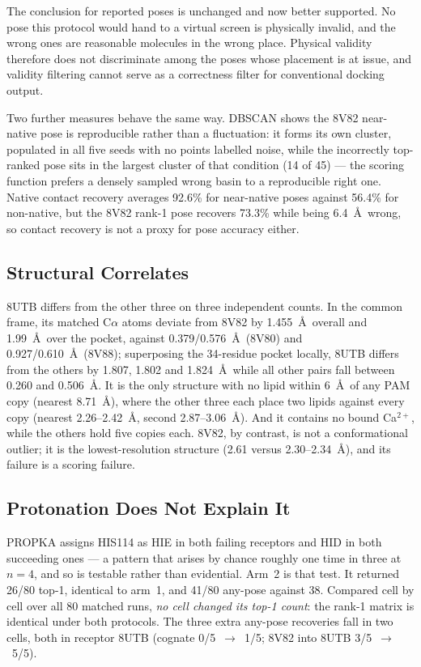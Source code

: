 \documentclass[sigconf]{acmart}
\begin{document}
The conclusion for reported poses is unchanged and now better supported. No pose
this protocol would hand to a virtual screen is physically invalid, and the wrong
ones are reasonable molecules in the wrong place. Physical validity therefore does
not discriminate among the poses whose placement is at issue, and validity
filtering cannot serve as a correctness filter for conventional docking output.

Two further measures behave the same way. DBSCAN shows the 8V82 near-native pose
is reproducible rather than a fluctuation: it forms its own cluster, populated in
all five seeds with no points labelled noise, while the incorrectly top-ranked
pose sits in the largest cluster of that condition (14 of 45) --- the scoring
function prefers a densely sampled wrong basin to a reproducible right one. Native
contact recovery averages 92.6\% for near-native poses against 56.4\% for
non-native, but the 8V82 rank-1 pose recovers 73.3\% while being 6.4~\AA\ wrong,
so contact recovery is not a proxy for pose accuracy either.

\subsection{Structural Correlates}
\label{sec:correlates}

8UTB differs from the other three on three independent counts. In the common
frame, its matched C$\alpha$ atoms deviate from 8V82 by 1.455~\AA\ overall and
1.99~\AA\ over the pocket, against 0.379/0.576~\AA\ (8V80) and 0.927/0.610~\AA\
(8V88); superposing the 34-residue pocket locally, 8UTB differs from the others by
1.807, 1.802 and 1.824~\AA\ while all other pairs fall between 0.260 and
0.506~\AA. It is the only structure with no lipid within 6~\AA\ of any PAM copy
(nearest 8.71~\AA), where the other three each place two lipids against every copy
(nearest 2.26--2.42~\AA, second 2.87--3.06~\AA). And it contains no bound
Ca$^{2+}$, while the others hold five copies each. 8V82, by contrast, is not a
conformational outlier; it is the lowest-resolution structure (2.61 versus
2.30--2.34~\AA), and its failure is a scoring failure.

\subsection{Protonation Does Not Explain It}

PROPKA assigns HIS114 as HIE in both failing receptors and HID in both succeeding
ones --- a pattern that arises by chance roughly one time in three at $n = 4$, and
so is testable rather than evidential. Arm~2 is that test. It returned 26/80
top-1, identical to arm~1, and 41/80 any-pose against 38. Compared cell by cell
over all 80 matched runs, \emph{no cell changed its top-1 count}: the rank-1
matrix is identical under both protocols. The three extra any-pose recoveries fall
in two cells, both in receptor 8UTB (cognate 0/5~$\rightarrow$~1/5; 8V82 into 8UTB
3/5~$\rightarrow$~5/5).
\end{document}
